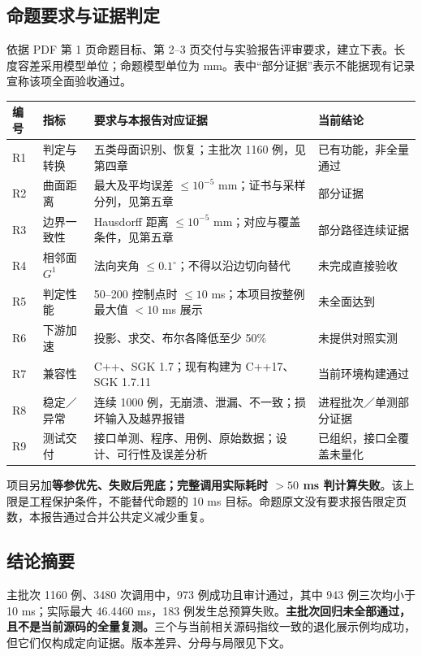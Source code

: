 \documentclass[UTF8,zihao=5,fontset=windows,a4paper]{ctexart}
\begin{document}
\subsection{命题要求与证据判定}
依据 PDF 第 1 页命题目标、第 2--3 页交付与实验报告评审要求，建立下表。长度容差采用模型单位；命题模型单位为 mm。表中“部分证据”表示不能据现有记录宣称该项全面验收通过。
\begin{center}\small\renewcommand{\arraystretch}{1.18}
\begin{tabularx}{\linewidth}{@{}p{8mm}p{25mm}Yp{25mm}@{}}\toprule
编号 & 指标 & 要求与本报告对应证据 & 当前结论\\\midrule
R1 & 判定与转换 & 五类母面识别、恢复；主批次 1160 例，见第四章 & 已有功能，非全量通过\\
R2 & 曲面距离 & 最大及平均误差 $\le10^{-5}$ mm；证书与采样分列，见第五章 & 部分证据\\
R3 & 边界一致性 & Hausdorff 距离 $\le10^{-5}$ mm；对应与覆盖条件，见第五章 & 部分路径连续证据\\
R4 & 相邻面 $G^1$ & 法向夹角 $\le0.1^\circ$；不得以沿边切向替代 & 未完成直接验收\\
R5 & 判定性能 & 50--200 控制点时 $\le10$ ms；本项目按整例最大值 $<10$ ms 展示 & 未全面达到\\
R6 & 下游加速 & 投影、求交、布尔各降低至少 50\% & 未提供对照实测\\
R7 & 兼容性 & C++、SGK 1.7；现有构建为 C++17、SGK 1.7.11 & 当前环境构建通过\\
R8 & 稳定／异常 & 连续 1000 例，无崩溃、泄漏、不一致；损坏输入及越界报错 & 进程批次／单测部分证据\\
R9 & 测试交付 & 接口单测、程序、用例、原始数据；设计、可行性及误差分析 & 已组织，接口全覆盖未量化\\\bottomrule
\end{tabularx}
\end{center}
项目另加\textbf{等参优先、失败后兜底；完整调用实际耗时 $>50$ ms 判计算失败}。该上限是工程保护条件，不能替代命题的 10 ms 目标。命题原文没有要求报告限定页数，本报告通过合并公共定义减少重复。

\subsection{结论摘要}
主批次 1160 例、3480 次调用中，973 例成功且审计通过，其中 943 例三次均小于 10 ms；实际最大 46.4460 ms，183 例发生总预算失败。\textbf{主批次回归未全部通过，且不是当前源码的全量复测。}三个与当前相关源码指纹一致的退化展示例均成功，但它们仅构成定向证据。版本差异、分母与局限见下文。
\end{document}

